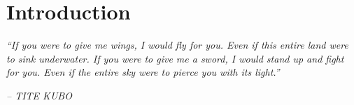 \chapter{Introduction} \label{cap:introduction}

\begin{displayquote}
    \begin{center}
        \textit{``If you were to give me wings, I would fly for you. Even if this entire land were to sink underwater. If you were to give me a sword, I would stand up and fight for you. Even if the entire sky were to pierce you with its light.''}
    \end{center}
\end{displayquote}

\begin{flushright}
   \textit{-- TITE KUBO}
\end{flushright}